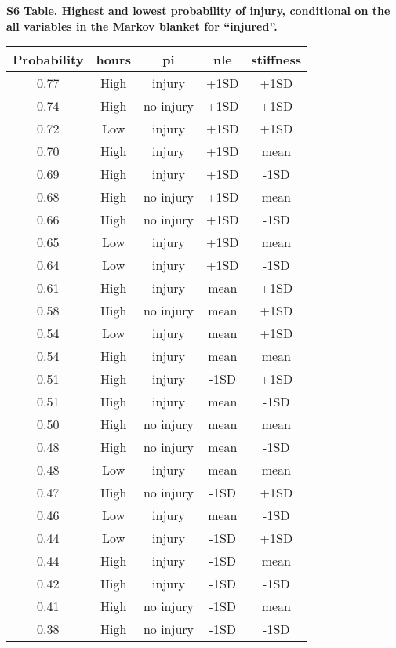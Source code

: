 \documentclass[
]{article}
\begin{document}
\newpage

\textbf{S6 Table. Highest and lowest probability of injury, conditional on the all variables in the Markov blanket for ``injured''.}

\begin{table}[H]
\centering
\begin{tabular}{c|c|c|c|c}
\hline
\textbf{Probability} & \textbf{hours} & \textbf{pi} & \textbf{nle} & \textbf{stiffness}\\
\hline
0.77 & High & injury & +1SD & +1SD\\
\hline
0.74 & High & no injury & +1SD & +1SD\\
\hline
0.72 & Low & injury & +1SD & +1SD\\
\hline
0.70 & High & injury & +1SD & mean\\
\hline
0.69 & High & injury & +1SD & -1SD\\
\hline
0.68 & High & no injury & +1SD & mean\\
\hline
0.66 & High & no injury & +1SD & -1SD\\
\hline
0.65 & Low & injury & +1SD & mean\\
\hline
0.64 & Low & injury & +1SD & -1SD\\
\hline
0.61 & High & injury & mean & +1SD\\
\hline
0.58 & High & no injury & mean & +1SD\\
\hline
0.54 & Low & injury & mean & +1SD\\
\hline
0.54 & High & injury & mean & mean\\
\hline
0.51 & High & injury & -1SD & +1SD\\
\hline
0.51 & High & injury & mean & -1SD\\
\hline
0.50 & High & no injury & mean & mean\\
\hline
0.48 & High & no injury & mean & -1SD\\
\hline
0.48 & Low & injury & mean & mean\\
\hline
0.47 & High & no injury & -1SD & +1SD\\
\hline
0.46 & Low & injury & mean & -1SD\\
\hline
0.44 & Low & injury & -1SD & +1SD\\
\hline
0.44 & High & injury & -1SD & mean\\
\hline
0.42 & High & injury & -1SD & -1SD\\
\hline
0.41 & High & no injury & -1SD & mean\\
\hline
0.38 & High & no injury & -1SD & -1SD\\

\end{tabular}
\end{table}
\end{document}
